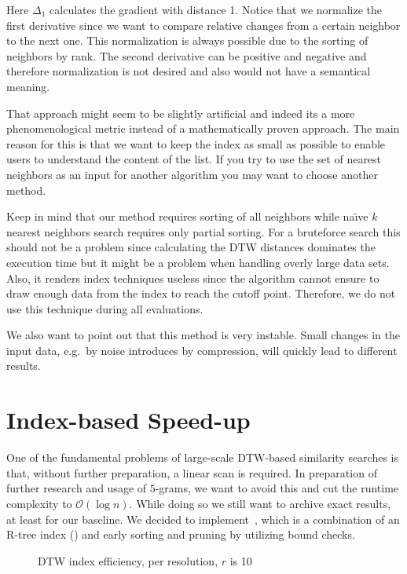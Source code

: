 Here $\Delta_1$ calculates the gradient with distance \num{1}. Notice that we normalize the first derivative since we want to compare relative changes from a certain neighbor to the next one. This normalization is always possible due to the sorting of neighbors by rank. The second derivative can be positive and negative and therefore normalization is not desired and also would not have a semantical meaning.

That approach might seem to be slightly artificial and indeed its a more phenomenological metric instead of a mathematically proven approach. The main reason for this is that we want to keep the index as small as possible to enable users to understand the content of the list. If you try to use the set of nearest neighbors as an input for another algorithm you may want to choose another method.

Keep in mind that our method requires sorting of all neighbors while na{\"\i}ve $k$ nearest neighbors search requires only partial sorting. For a bruteforce search this should not be a problem since calculating the DTW distances dominates the execution time but it might be a problem when handling overly large data sets. Also, it renders index techniques useless since the algorithm cannot ensure to draw enough data from the index to reach the cutoff point. Therefore, we do not use this technique during all evaluations.

We also want to point out that this method is very instable. Small changes in the input data, e.g.\ by noise introduces by compression, will quickly lead to different results.



\section{Index-based Speed-up}
\label{sec:baseline:speed}

One of the fundamental problems of large-scale DTW-based similarity searches is that, without further preparation, a linear scan is required. In preparation of further research and usage of $5$-grams, we want to avoid this and cut the runtime complexity to $\mathcal{O}(\log{n})$. While doing so we still want to archive exact results, at least for our baseline. We decided to implement~\cite{LB_Keogh}, which is a combination of an R-tree index (\cite{rtree}) and early sorting and pruning by utilizing bound checks.

\begin{figure}
    \centering
    
    \caption{DTW index efficiency, per resolution, $r$ is \num{10}}\label{fig:dtw_index}
\end{figure}

